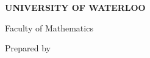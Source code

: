 
\begin{center}
    \textbf{UNIVERSITY OF WATERLOO}

    Faculty of Mathematics

    \vfill

    \textbf{\MakeUppercase{\reporttitle}}

    \vfill

    \employername

    \employerlocation

    \vfill

    Prepared by

    \studentname

    \studentnumber

    \term{} \academicprogram

    \reportdate

    \newpage
\end{center}
